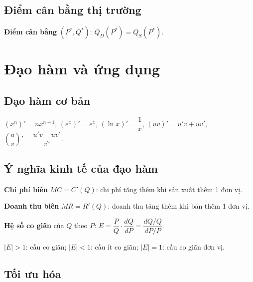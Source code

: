 \documentclass[12pt,a4paper]{article}
\begin{document}
\subsection{Điểm cân bằng thị trường}

\begin{dinhnghia}
  \textbf{Điểm cân bằng} $(P^*, Q^*)$: $Q_D(P^*) = Q_S(P^*)$.
\end{dinhnghia}

\section{Đạo hàm và ứng dụng}

\subsection{Đạo hàm cơ bản}

\begin{congthuc}
  $(x^n)' = nx^{n-1}$, $(e^x)' = e^x$, $(\ln x)' = \dfrac{1}{x}$, $(uv)' = u'v + uv'$, $\left(\dfrac{u}{v}\right)' = \dfrac{u'v - uv'}{v^2}$.
\end{congthuc}

\subsection{Ý nghĩa kinh tế của đạo hàm}

\begin{dinhnghia}
  \textbf{Chi phí biên} $MC = C'(Q)$: chi phí tăng thêm khi sản xuất thêm 1 đơn vị.
\end{dinhnghia}

\begin{dinhnghia}
  \textbf{Doanh thu biên} $MR = R'(Q)$: doanh thu tăng thêm khi bán thêm 1 đơn vị.
\end{dinhnghia}

\begin{dinhnghia}
  \textbf{Hệ số co giãn} của $Q$ theo $P$: $E = \dfrac{P}{Q} \cdot \dfrac{dQ}{dP} = \dfrac{dQ/Q}{dP/P}$.
\end{dinhnghia}

\begin{luuy}
  $|E| > 1$: cầu co giãn; $|E| < 1$: cầu ít co giãn; $|E| = 1$: cầu co giãn đơn vị.
\end{luuy}

\subsection{Tối ưu hóa}
\end{document}
